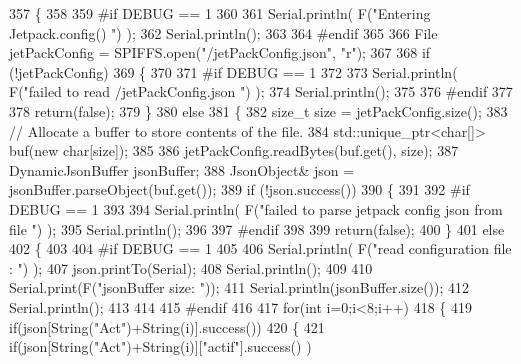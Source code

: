 \begin{DoxyCode}
357 \{
358 
359 \textcolor{preprocessor}{#if DEBUG == 1 }
360 
361     Serial.println( F(\textcolor{stringliteral}{"Entering Jetpack.config() "}) );
362     Serial.println();
363 
364 \textcolor{preprocessor}{#endif}
365 
366     File jetPackConfig = SPIFFS.open(\textcolor{stringliteral}{"/jetPackConfig.json"}, \textcolor{stringliteral}{"r"});
367 
368     \textcolor{keywordflow}{if} (!jetPackConfig) 
369     \{
370 
371 \textcolor{preprocessor}{    #if DEBUG == 1 }
372 
373         Serial.println( F(\textcolor{stringliteral}{"failed to read /jetPackConfig.json "}) );
374         Serial.println();
375 
376 \textcolor{preprocessor}{    #endif}
377 
378         \textcolor{keywordflow}{return}(\textcolor{keyword}{false});
379     \}
380     \textcolor{keywordflow}{else}
381     \{
382         \textcolor{keywordtype}{size\_t} size = jetPackConfig.size();
383         \textcolor{comment}{// Allocate a buffer to store contents of the file.}
384         std::unique\_ptr<char[]> buf(\textcolor{keyword}{new} \textcolor{keywordtype}{char}[size]);
385 
386         jetPackConfig.readBytes(buf.get(), size);
387         DynamicJsonBuffer jsonBuffer;
388         JsonObject& json = jsonBuffer.parseObject(buf.get());
389         \textcolor{keywordflow}{if} (!json.success()) 
390         \{
391         
392 \textcolor{preprocessor}{        #if DEBUG == 1 }
393 
394             Serial.println( F(\textcolor{stringliteral}{"failed to parse jetpack config json from file "}) );
395             Serial.println();
396 
397 \textcolor{preprocessor}{        #endif}
398 
399             \textcolor{keywordflow}{return}(\textcolor{keyword}{false});
400         \} 
401         \textcolor{keywordflow}{else}
402         \{ 
403         
404 \textcolor{preprocessor}{        #if DEBUG == 1 }
405 
406             Serial.println( F(\textcolor{stringliteral}{"read configuration file : "}) );
407             json.printTo(Serial);
408             Serial.println();
409 
410             Serial.print(F(\textcolor{stringliteral}{"jsonBuffer size: "}));
411             Serial.println(jsonBuffer.size());
412             Serial.println();
413 
414         
415 \textcolor{preprocessor}{        #endif}
416   
417             \textcolor{keywordflow}{for}(\textcolor{keywordtype}{int} i=0;i<8;i++)
418             \{   
419                 \textcolor{keywordflow}{if}(json[String(\textcolor{stringliteral}{"Act"})+String(i)].success())
420                 \{
421                     \textcolor{keywordflow}{if}(json[String(\textcolor{stringliteral}{"Act"})+String(i)][\textcolor{stringliteral}{"actif"}].success() )

\end{DoxyCode}
